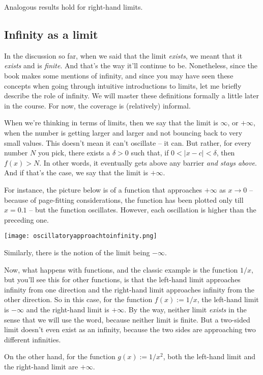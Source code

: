 \documentclass[10pt]{amsart}
\begin{document}
Analogous results hold for right-hand limits.

\subsection{Infinity as a limit}

In the discussion so far, when we said that the limit {\em exists}, we
meant that it {\em exists} and is {\em finite}. And that's the way
it'll continue to be. Nonetheless, since the book makes some mentions
of infinity, and since you may have seen these concepts when going
through intuitive introductions to limits, let me briefly describe the
role of infinity. We will master these definitions formally a little
later in the course. For now, the coverage is (relatively) informal.

When we're thinking in terms of limits, then we say that the limit is
$\infty$, or $+\infty$, when the number is getting larger and larger
and not bouncing back to very small values. This doesn't mean it can't
oscillate -- it can. But rather, for every number $N$ you pick, there
exists a $\delta > 0$ such that, if $0 < |x - c| < \delta$, then $f(x)
> N$. In other words, it eventually gets above any barrier {\em and
stays above}. And if that's the case, we say that the limit is
$+\infty$.

For instance, the picture below is of a function that approaches
$+\infty$ as $x \to 0$ -- because of page-fitting considerations, the
function has been plotted only till $x = 0.1$ -- but the function
oscillates. However, each oscillation is higher than the preceding
one.

\texttt{[image: oscillatoryapproachtoinfinity.png]}

Similarly, there is the notion of the limit being $-\infty$.

Now, what happens with functions, and the classic example is the
function $1/x$, but you'll see this for other functions, is that the
left-hand limit approaches infinity from one direction and the
right-hand limit approaches infinity from the other direction. So in
this case, for the function $f(x) := 1/x$, the left-hand limit is
$-\infty$ and the right-hand limit is $+\infty$. By the way, neither
limit {\em exists} in the sense that we will use the word, because
neither limit is finite. But a two-sided limit doesn't even exist as
an infinity, because the two sides are approaching two different
infinities.

On the other hand, for the function $g(x) := 1/x^2$, both the
left-hand limit and the right-hand limit are $+\infty$.
\end{document}
